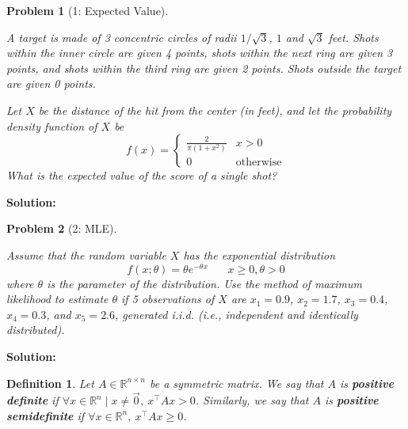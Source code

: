 \documentclass[11pt]{exam}
\theoremstyle{quest}
\newtheorem*{definition}{Definition}
\newtheorem*{question}{Problem}
\begin{document}
\begin{question}[1: Expected Value]
~

A target is made of 3 concentric circles of radii $1/{\sqrt{3}}$, $1$ and
$\sqrt{3}$ feet. Shots within the inner circle are given 4 points, shots within
the next ring are given 3 points, and shots within the third ring are given 2
points. Shots outside the target are given 0 points.

Let $X$ be the distance of the hit from the center (in feet), and let the probability density function
of $X$ be
\[
f(x) =
  \begin{cases}
   \frac{2}{\pi (1+x^2)} & x>0 \\
   0 &  \text{otherwise}
  \end{cases}
\]
What is the expected value of the score of a single shot?
\end{question}
\textbf{Solution:}


\newpage


\begin{question}[2: MLE]
~

Assume that the random variable $X$ has the exponential distribution
\[
f(x;\theta) = \theta e^{-\theta x} \ \ \ \ \ \ \ \ x \geq 0, \theta > 0
\]
where $\theta$ is the parameter of the distribution. Use the method of maximum
likelihood to estimate $\theta$ if 5 observations of $X$ are $x_1 = 0.9$, $x_2 =
1.7$, $x_3 = 0.4$, $x_4 = 0.3$, and $x_5 = 2.6$, generated i.i.d. (i.e.,
independent and identically distributed).
\end{question}
\textbf{Solution:}


\newpage


\begin{definition}
Let $A \in \mathbb{R}^{n \times n}$ be a symmetric matrix. We say that $A$ is
\textbf{positive definite} if $\forall x\in \mathbb{R}^n \mid x \neq \vec{0},\ x^\top Ax >
0$. Similarly, we say that $A$ is \textbf{positive semidefinite} if $\forall x
\in \mathbb{R}^n,\ x^\top Ax \geq 0$.
\end{definition}
\end{document}
